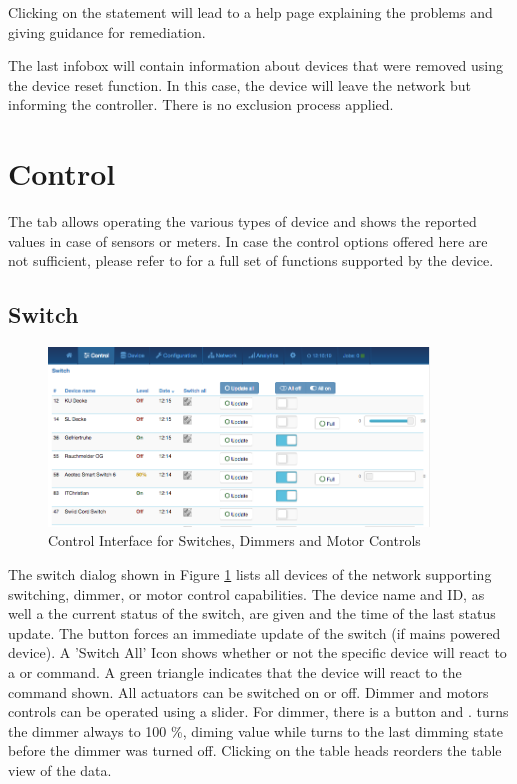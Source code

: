 Clicking on the statement will lead to a help page explaining the problems and giving 
guidance for remediation.

The last infobox will contain information about devices that were removed using 
the device reset function. In this case, the device will leave the network but 
informing the controller. There is no exclusion process applied.

\section{Control}

The tab  allows operating the various types of device and shows the reported 
values in case of sensors or meters. In case the control options offered here are not 
sufficient, please refer to    for a full set of functions supported by the device.

\subsection{Switch}

\begin{figure}
\begin{center}
\includegraphics[width=0.9\textwidth]{pngs/cap7/eui2.png}
\caption{Control Interface for Switches, Dimmers and Motor Controls}
\label{eui2}
\end{center}
\end{figure}

The switch dialog shown in Figure \ref{eui2} lists all devices of the network supporting 
switching, dimmer, or motor control capabilities. The device name and \zwave ID, as well a 
the current status of the switch, are given and the time of the last status update. 
The  button forces an immediate update of the switch (if mains powered device). 
A 'Switch All' Icon shows whether or not the specific device will react to 
a  or  command. A green triangle indicates that the 
device will react to the command shown.
All actuators can be switched on or off. Dimmer and motors controls can be operated 
using a slider. For dimmer, there is a button  and .  turns the 
dimmer always to 100 \%, diming value while  turns to the last dimming state
before the dimmer was turned off. Clicking on the table heads reorders the table 
view of the data.


